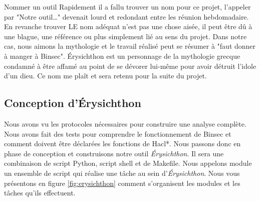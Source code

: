 \begin{CitationBox}{Nommer un outil}
    Rapidement il a fallu trouver un nom pour ce projet, l'appeler par "Notre outil\dots" devenait lourd et redondant entre les réunion hebdomadaire. En revanche trouver LE nom adéquat n'est pas une chose aisée, il peut être dû à une blague, une référence ou plus simplement lié au sens du projet. Dans notre cas, nous aimons la mythologie et le travail réalisé peut se résumer à "faut donner à manger à Binsec".\smallbreak
    Érysichthon est un personnage de la mythologie grecque condamné à être affamé au point de se dévorer lui-même pour avoir détruit l'idole d'un dieu. Ce nom me plaît et sera retenu pour la suite du projet. 
\end{CitationBox}

\subsection*{Conception d'Érysichthon}


Nous avons vu les protocoles nécessaires pour construire une analyse complète. Nous avons fait des tests pour comprendre le fonctionnement de Binsec et comment doivent être déclarées les fonctions de Hacl*. Nous passons donc en phase de conception et construisons notre outil \textit{Érysichthon}. Il sera une combinaison de script Python, script shell et de Makefile. Nous appelons module un ensemble de script qui réalise une tâche au sein d'\textit{Érysichthon}. Nous vous présentons en figure \ref{fig:erysichthon} comment s'organisent les modules et les tâches qu'ils effectuent.

